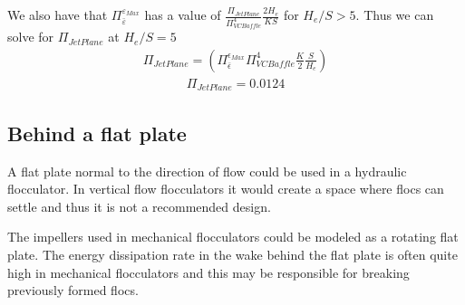\documentclass[letterpaper,10pt,english]{sphinxmanual}
\begin{document}
We also have that \(\Pi_{\bar \varepsilon}^{\varepsilon_{Max}}\) has a value of
\(\frac{\Pi_{JetPlane}}{\Pi_{VCBaffle}^4} \frac{2 H_e}{K S}\) for
\(H_e/S>5\). Thus we can solve for \(\Pi_{JetPlane}\) at
\(H_e/S=5\)
\begin{equation}\label{equation:Rapid_Mix/RM_Derivations:Rapid_Mix/RM_Derivations:130}
\begin{split}\Pi_{JetPlane} = \left(
  \Pi_{\bar \epsilon}^{\epsilon_{Max}} \Pi_{VCBaffle}^4 \frac{K}{2} \frac{S}{H_e}
  \right)\end{split}
\end{equation}\begin{equation}\label{equation:Rapid_Mix/RM_Derivations:Rapid_Mix/RM_Derivations:131}
\begin{split}\Pi_{JetPlane} = 0.0124\end{split}
\end{equation}
%
\begin{sphinxVerbatim}[commandchars=\\\{\}]
    

\end{sphinxVerbatim}


\subsection{Behind a flat plate}
\label{\detokenize{Rapid_Mix/RM_Derivations:behind-a-flat-plate}}\label{\detokenize{Rapid_Mix/RM_Derivations:heading-behind-a-flat-plate}}
A flat plate normal to the direction of flow could be used in a hydraulic flocculator. In vertical flow flocculators it would create a space where flocs can settle and thus it is not a recommended design.

The impellers used in mechanical flocculators could be modeled as a rotating flat plate. The energy dissipation rate in the wake behind the flat plate is often quite high in mechanical flocculators and this may be responsible for breaking previously formed flocs.
\end{document}
